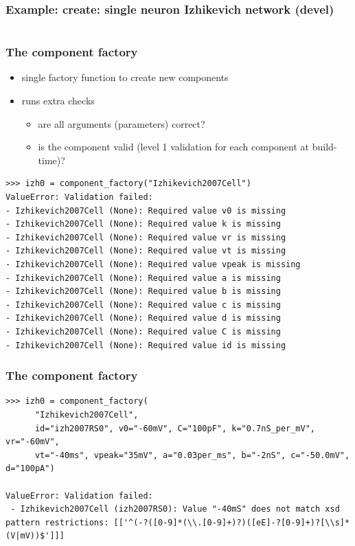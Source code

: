 \begin{frame}[t]
  \frametitle{Example: create: single neuron Izhikevich network (devel)}
  \inputminted[fontsize=\tiny,firstnumber=1,firstline=17,lastline=42,linenos]{python}{./extras/izhikevich-single-neuron-dev.py}
\end{frame}
\begin{frame}[t,fragile]
  \frametitle{The component factory}
  \begin{itemize}
    \item single factory function to create new components
    \item runs extra checks
      \begin{itemize}
        \item are all arguments (parameters) correct?
        \item is the component valid (level 1 validation for each component at build-time)?
      \end{itemize}
  \end{itemize}
 \begin{verbatim}
>>> izh0 = component_factory("Izhikevich2007Cell")
ValueError: Validation failed:
- Izhikevich2007Cell (None): Required value v0 is missing
- Izhikevich2007Cell (None): Required value k is missing
- Izhikevich2007Cell (None): Required value vr is missing
- Izhikevich2007Cell (None): Required value vt is missing
- Izhikevich2007Cell (None): Required value vpeak is missing
- Izhikevich2007Cell (None): Required value a is missing
- Izhikevich2007Cell (None): Required value b is missing
- Izhikevich2007Cell (None): Required value c is missing
- Izhikevich2007Cell (None): Required value d is missing
- Izhikevich2007Cell (None): Required value C is missing
- Izhikevich2007Cell (None): Required value id is missing
 \end{verbatim}
\end{frame}
\begin{frame}[t,fragile]
  \frametitle{The component factory}
 \begin{verbatim}
>>> izh0 = component_factory(
      "Izhikevich2007Cell",
      id="izh2007RS0", v0="-60mV", C="100pF", k="0.7nS_per_mV", vr="-60mV",
      vt="-40ms", vpeak="35mV", a="0.03per_ms", b="-2nS", c="-50.0mV", d="100pA")

ValueError: Validation failed:
 - Izhikevich2007Cell (izh2007RS0): Value "-40mS" does not match xsd pattern restrictions: [['^(-?([0-9]*(\\.[0-9]+)?)([eE]-?[0-9]+)?[\\s]*(V|mV))$']]]
 \end{verbatim}
\end{frame}

